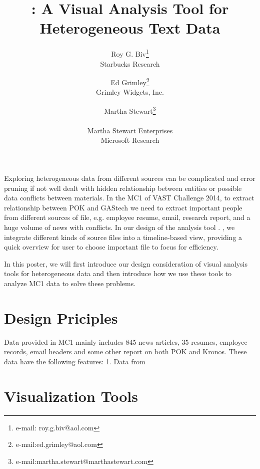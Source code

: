 \documentclass{vgtc}                          %
\title{\projectname: A Visual Analysis Tool for Heterogeneous Text Data}
\author{Roy G. Biv\thanks{e-mail: roy.g.biv@aol.com}\\ %
        \scriptsize Starbucks Research %
\and Ed Grimley\thanks{e-mail:ed.grimley@aol.com}\\ %
     \scriptsize Grimley Widgets, Inc. %
\and Martha Stewart\thanks{e-mail:martha.stewart@marthastewart.com}\\ %
     \parbox{1.4in}{\scriptsize \centering Martha Stewart Enterprises \\ Microsoft Research}}
\begin{document}


\maketitle

Exploring heterogeneous data from different sources can be complicated and error pruning if not well dealt with hidden relationship between entities or possible data conflicts between materials. 
In the MC1 of VAST Challenge 2014, to extract relationship between POK and GAStech we need to extract important people from different sources of file, e.g. employee resume, email, research report, and a huge volume of news with conflicts. 
In our design of the analysis tool \projectname. , we integrate different kinds of source files into a timeline-based view, providing a quick overview for user to choose important file to focus for efficiency. 
\par
In this poster, we will first introduce our design consideration of visual analysis tools for heterogeneous data and then introduce how we use these tools to analyze MC1 data to solve these problems.


\section{Design Priciples}
Data provided in MC1 mainly includes 845 news articles, 35 resumes, employee records, email headers and some other report on both POK and Kronos. These data have the following features: 1. Data from 


\section{Visualization Tools}
\end{document}
